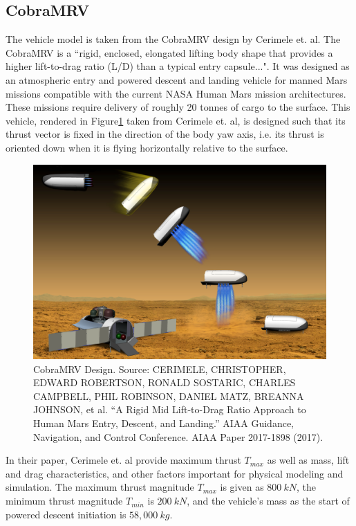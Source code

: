 \subsection{CobraMRV} \label{sec:CobraMRV}
The vehicle model is taken from the CobraMRV design by Cerimele et. al\:\cite{CERIMELE}. The CobraMRV is a ``rigid, enclosed, elongated lifting body shape that provides a higher lift-to-drag ratio (L/D) than a typical entry capsule...". It was designed as an atmospheric entry and powered descent and landing vehicle for manned Mars missions compatible with the current NASA Human Mars mission architectures. These missions require delivery of roughly 20 tonnes of cargo to the surface. This vehicle, rendered in Figure\:\ref{fig:CobraMRV} taken from Cerimele et. al, is designed such that its thrust vector is fixed in the direction of the body yaw axis, i.e. its thrust is oriented down when it is flying horizontally relative to the surface. 

\begin{figure}[H]
	\centering
	\begin{minipage}{4.3 in}
		\includegraphics[width=\linewidth]{Figures/CobraMRV.png}
		\caption{CobraMRV Design. Source: CERIMELE, CHRISTOPHER, EDWARD ROBERTSON, RONALD SOSTARIC,
			CHARLES CAMPBELL, PHIL ROBINSON, DANIEL MATZ,
			BREANNA JOHNSON, et al. “A Rigid Mid Lift-to-Drag Ratio Approach to Human
			Mars Entry, Descent, and Landing.” AIAA Guidance, Navigation, and Control
			Conference. AIAA Paper 2017-1898 (2017). \label{fig:CobraMRV} }
	\end{minipage}
\end{figure}

In their paper, Cerimele et. al\:\cite{CERIMELE} provide maximum thrust $T_{max}$ as well as mass, lift and drag characteristics, and other factors important for physical modeling and simulation. The maximum thrust magnitude $T_{max}$ is given as $800\:kN$, the minimum thrust magnitude $T_{min}$ is $200\:kN$, and the vehicle's mass as the start of powered descent initiation is $58,000\:kg$.

